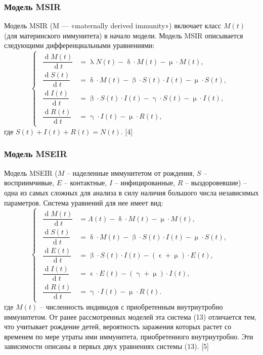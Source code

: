 \documentclass[a4paper, 12pt]{extarticle}
\numberwithin{equation}{section}
\renewcommand{\beta}{\upbeta}
\renewcommand{\gamma}{\upgamma}
\renewcommand{\delta}{\updelta}
\renewcommand{\lambda}{\uplambda}
\renewcommand{\mu}{\upmu}
\renewcommand{\d}{\operatorname{d}}
\renewcommand{\epsilon}{\upvarepsilon}
\begin{document}
	\subsubsection{Модель MSIR}
	Модель MSIR (M — «maternally derived immunity») включает класс $M(t)$ (для материнского иммунитета) в начало модели. Модель MSIR описывается следующими дифференциальными уравнениями:
	\begin{equation}
		\left\{ 
		\begin{gathered} 
			\begin{aligned}
				\dfrac {\d M(t)}{\d t} &= \lambda N(t) - \delta\cdot M(t)-\mu\cdot M(t),\\
				\dfrac {\d S(t)}{\d t} &= \delta \cdot M(t) -\beta\cdot S(t)\cdot I(t) - \mu \cdot S(t),\\
				\dfrac{\d I(t)}{\d t} &=\beta\cdot S(t)\cdot I(t) - \gamma \cdot S(t) - \mu \cdot I(t),\\
				\dfrac{\d R(t)}{\d t} &= \gamma\cdot I(t) - \mu \cdot R(t), 
			\end{aligned}
		\end{gathered} 
		\right.
	\end{equation}
	где $S(t) + I(t) + R(t) = N(t).$ [4]
	\subsubsection{Модель MSEIR}
	Модель MSEIR ($M$ -- наделенные иммунитетом от рождения, $S$ -- восприимчивые, $E$ -- контактные, $I$ -- инфицированные, $R$ -- выздоровевшие) -- одна из самых сложных для анализа в силу наличия большого числа независимых параметров. Система уравнений для нее имеет вид:
	\begin{equation}
		\left\{ 
		\begin{gathered} 
			\begin{aligned}
				\dfrac {\d M(t)}{\d t} &= \Lambda(t) - \delta\cdot M(t)-\mu\cdot M(t),\\
				\dfrac {\d S(t)}{\d t} &= \delta \cdot M(t) -\beta\cdot S(t)\cdot I(t) - \mu \cdot S(t),\\
				\dfrac {\d E(t)}{\d t} &= \beta \cdot S(t)\cdot I(t) - (\epsilon + \mu)\cdot E(t),\\
				\dfrac{\d I(t)}{\d t} &=\epsilon \cdot E(t) - (\gamma + \mu)\cdot I(t),\\
				\dfrac{\d R(t)}{\d t} &= \gamma\cdot I(t) - \mu \cdot R(t). 
			\end{aligned}
		\end{gathered} 
		\right.
	\end{equation}
	где $M (t)$ -- численность индивидов с приобретенным внутриутробно иммунитетом. От ранее рассмотренных моделей эта система (13) отличается тем, что учитывает рождение детей, вероятность заражения которых растет со временем по мере утраты ими иммунитета, приобретенного внутриутробно. Эти зависимости описаны в первых двух уравнениях системы (13). [5]
	
\end{document}
